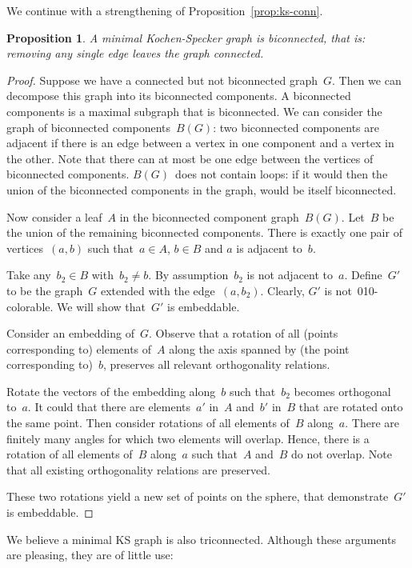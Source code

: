 \documentclass[a4paper]{article}
\newcounter{main}
\newtheorem{prop}[main]{Proposition}
\theoremstyle{definition}
\theoremstyle{remark}
\begin{document}
We continue with a strengthening of Proposition~\ref{prop:ks-conn}.
\begin{prop}
A minimal Kochen-Specker graph is biconnected,
that is: removing any single edge leaves the graph connected.
\end{prop}
\begin{proof}
Suppose we have a connected but not biconnected graph~$G$.
Then we can decompose
this graph into its biconnected components.  A biconnected components
is a maximal subgraph that is biconnected.
We can consider the graph of biconnected components~$B(G)$:
two biconnected components are adjacent if there is an edge
between a vertex in one component and a vertex in the other.
Note that there can at most be one edge between 
the vertices of biconnected components.
$B(G)$~does not contain loops: if it would
then the union of the biconnected components in the graph,
would be itself biconnected.

Now consider a leaf~$A$ in the biconnected component graph~$B(G)$.
Let~$B$ be the union of the remaining biconnected components.
There is exactly one pair of vertices~$(a,b)$
such that~$a \in A$, $b \in B$ and $a$ is adjacent to~$b$.

Take any~$b_2 \in B$ with~$b_2 \neq b$.
By assumption~$b_2$ is not adjacent to~$a$.
Define~$G'$ to be the graph~$G$ extended with the edge~$(a,b_2)$.
Clearly, $G'$ is not~010-colorable.  We will show that~$G'$ is embeddable.

Consider an embedding of~$G$.
Observe that a rotation of all (points corresponding to) elements of~$A$
along the axis spanned
by (the point corresponding to)~$b$, preserves all relevant
orthogonality relations.

Rotate the vectors of the embedding
along~$b$ such that~$b_2$ becomes orthogonal to~$a$.
It could that there are elements~$a'$ in~$A$
and~$b'$ in~$B$ that are rotated onto the same point.
Then consider rotations of all elements of~$B$ along~$a$.
There are finitely many angles for which two elements will overlap.
Hence, there is a rotation of all elements of~$B$ along~$a$
such that~$A$ and~$B$ do not overlap.
Note that all existing orthogonality relations are preserved.

These two rotations yield a new set of points on the sphere,
that demonstrate~$G'$ is embeddable. 
\end{proof}
We believe a minimal KS graph is also triconnected.
Although these arguments are pleasing,
they are of little use:
\end{document}
